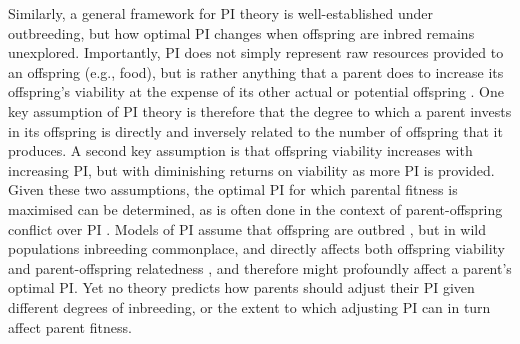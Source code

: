 \documentclass[12pt]{article}
\begin{document}

Similarly, a general framework for PI theory is well-established under outbreeding, but how optimal PI changes when offspring are inbred remains unexplored. Importantly, PI does not simply represent raw resources provided to an offspring (e.g., food), but is rather anything that a parent does to increase its offspring's viability at the expense of its other actual or potential offspring \cite[][]{Trivers1972, Trivers1974}. One key assumption of PI theory is therefore that the degree to which a parent invests in its offspring is directly and inversely related to the number of offspring that it produces. A second key assumption is that offspring viability increases with increasing PI, but with diminishing returns on viability as more PI is provided. Given these two assumptions, the optimal PI for which parental fitness is maximised can be determined, as is often done in the context of parent-offspring conflict over PI \cite[e.g.,][]{Macnair1978, Parker1978, Parker1985, DeJong2005, Kuijper2012}. Models of PI assume that offspring are outbred \cite[or result from self-fertilisation,][]{DeJong2005}, but in wild populations inbreeding commonplace, and directly affects both offspring viability and parent-offspring relatedness \cite[][]{OGrady2006, Charlesworth2009}, and therefore might profoundly affect a parent's optimal PI. Yet no theory predicts how parents should adjust their PI given different degrees of inbreeding, or the extent to which adjusting PI can in turn affect parent fitness. %
\end{document}
